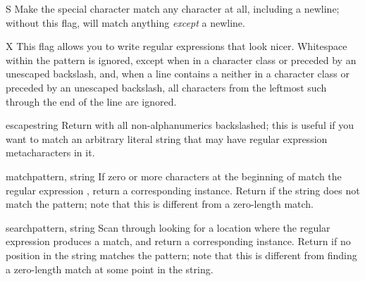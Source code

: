 \begin{datadesc}{S}
Make the  special character match any character at all, including a
newline; without this flag,  will match anything \emph{except}
a newline.
\end{datadesc}

\begin{datadesc}{X}
This flag allows you to write regular expressions that look nicer.
Whitespace within the pattern is ignored, 
except when in a character class or preceded by an unescaped
backslash, and, when a line contains a \character{\#} neither in a character
class or preceded by an unescaped backslash, all characters from the
leftmost such \character{\#} through the end of the line are ignored.
\end{datadesc}


\begin{funcdesc}{escape}{string}
  Return  with all non-alphanumerics backslashed; this is
  useful if you want to match an arbitrary literal string that may have
  regular expression metacharacters in it.
\end{funcdesc}

\begin{funcdesc}{match}{pattern, string}
  If zero or more characters at the beginning of  match
  the regular expression , return a corresponding
   instance.  Return  if the string does not
  match the pattern; note that this is different from a zero-length
  match.
\end{funcdesc}

\begin{funcdesc}{search}{pattern, string}
  Scan through  looking for a location where the regular
  expression  produces a match, and return a
  corresponding  instance.
  Return  if no
  position in the string matches the pattern; note that this is
  different from finding a zero-length match at some point in the string.
\end{funcdesc}

